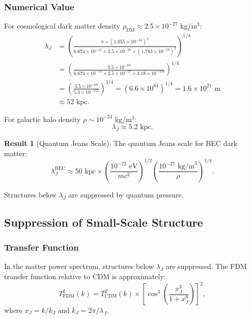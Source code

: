 \documentclass[11pt,a4paper]{article}
\newcommand{\ee}[1]{\times 10^{#1}}
\theoremstyle{definition}
\newtheorem{result}{Result}
\theoremstyle{remark}
\begin{document}
\subsubsection{Numerical Value}

For cosmological dark matter density $\rho_{\mathrm{DM}} \approx 2.5 \times 10^{-27}$ kg/m$^3$:
\begin{align}
\lambda_J &= \left(\frac{\pi \times (1.055\ee{-34})^2}{6.674\ee{-11} \times 2.5\ee{-27} \times (1.783\ee{-58})^2}\right)^{1/4} \\
&= \left(\frac{3.5\ee{-68}}{6.674\ee{-11} \times 2.5\ee{-27} \times 3.18\ee{-116}}\right)^{1/4} \\
&= \left(\frac{3.5\ee{-68}}{5.3\ee{-153}}\right)^{1/4} = (6.6\ee{84})^{1/4} = 1.6\ee{21} \text{ m} \\
&\approx 52 \text{ kpc}.
\end{align}

For galactic halo density $\rho \sim 10^{-24}$ kg/m$^3$:
\begin{equation}
\lambda_J \approx 5.2 \text{ kpc}.
\end{equation}

\begin{result}[Quantum Jeans Scale]
The quantum Jeans scale for BEC dark matter:
\begin{equation}
\boxed{\lambda_J^{\mathrm{BEC}} \approx 50 \text{ kpc} \times \left(\frac{10^{-22}\text{ eV}}{mc^2}\right)^{1/2} \left(\frac{10^{-27}\text{ kg/m}^3}{\rho}\right)^{1/4}.}
\end{equation}

Structures below $\lambda_J$ are suppressed by quantum pressure.
\end{result}

\subsection{Suppression of Small-Scale Structure}
\label{sec:suppression}

\subsubsection{Transfer Function}

In the matter power spectrum, structures below $\lambda_J$ are suppressed. The FDM transfer function relative to CDM is approximately:
\begin{equation}
T^2_{\mathrm{FDM}}(k) = T^2_{\mathrm{CDM}}(k) \times \left[\cos^3\left(\frac{x_J^3}{1 + x_J^8}\right)\right]^2,
\end{equation}
where $x_J = k/k_J$ and $k_J = 2\pi/\lambda_J$.
\end{document}
